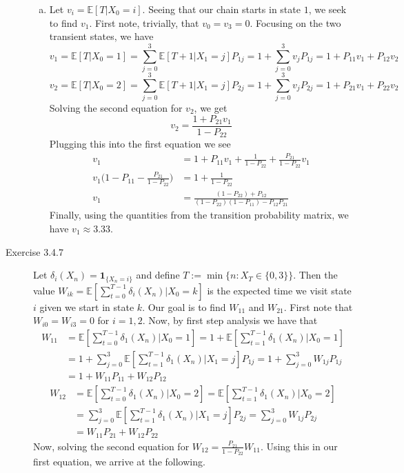 \documentclass[12pt]{article}  %
\newcommand{\E}{{\mathbb{E}}}
\newcommand{\ind}{{\mathbf{1}}}
\begin{document}
\begin{description}
\begin{enumerate}[(a)]
\item Let $v_i = \E[T|X_0=i]$. Seeing that our chain starts in state $1$, we seek to find $v_1$. First note, trivially, that $v_0 = v_3 = 0$. Focusing on the two transient states, we have 
$$v_1 = \E[T|X_0 = 1] = \sum_{j = 0}^{3}\E[T+1|X_1 = j]P_{1j} = 1 + \sum_{j = 0}^3 v_jP_{1j} = 1+P_{11}v_1 + P_{12}v_2$$
$$v_2 = \E[T|X_0 = 2] = \sum_{j = 0}^{3}\E[T+1|X_1 = j]P_{2j} = 1 + \sum_{j = 0}^3 v_jP_{2j} = 1+P_{21}v_1 + P_{22}v_2$$
Solving the second equation for $v_2$, we get 
$$v_2 = \frac{1 + P_{21}v_1}{1-P_{22}}$$ Plugging this into the first equation we see 
\begin{align*}
v_1 &= 1 + P_{11}v_1 + \frac{1}{1-P_{22}} + \frac{P_{21}}{1-P_{22}}v_1\\
v_1\Big(1 - P_{11} - \frac{P_{21}}{1-P_{22}}\Big) &= 1 + \frac{1}{1-P_{22}}\\
v_1 &= \frac{(1-P_{22}) + P_{12}}{(1-P_{22})(1-P_{11})-P_{12}P_{21}}
\end{align*}
Finally, using the quantities from the transition probability matrix, we have $v_1 \approx 3.33$. 
\end{enumerate}
\item[Exercise 3.4.7] Let $\delta_{i}(X_n) = \ind_{\{X_{n} = i\}}$ and define $T := \min\{n: X_T\in\{0,3\}\}$. Then the value $W_{ik} = \E\left[\sum_{t = 0}^{T-1}\delta_{i}(X_n)|X_0 = k\right]$ is the expected time we visit state $i$ given we start in state $k$. Our goal is to find $W_{11}$ and $W_{21}$. First note that $W_{i0} = W_{i3} = 0$ for $i = 1,2$. Now, by first step analysis we have that 
\begin{align*}
W_{11} &= \E\left[\sum_{t = 0}^{T-1}\delta_{1}(X_n)|X_0 = 1\right] = 1 + \E\left[\sum_{t = 1}^{T-1}\delta_{1}(X_n)|X_0 = 1\right]\\
&= 1 + \sum_{j = 0}^3\E\left[\sum_{t = 1}^{T-1}\delta_{1}(X_n)|X_1 = j\right]P_{1j} = 1 + \sum_{j = 0}^3W_{1j}P_{1j}\\
&= 1 + W_{11}P_{11} + W_{12}P_{12}
\end{align*}
\begin{align*}
W_{12} &= \E\left[\sum_{t = 0}^{T-1}\delta_{1}(X_n)|X_0 = 2\right] = \E\left[\sum_{t = 1}^{T-1}\delta_{1}(X_n)|X_0 = 2\right]\\
&= \sum_{j = 0}^3\E\left[\sum_{t = 1}^{T-1}\delta_{1}(X_n)|X_1 = j\right]P_{2j} = \sum_{j = 0}^3W_{1j}P_{2j}\\
&= W_{11}P_{21} + W_{12}P_{22}
\end{align*}
Now, solving the second equation for $W_{12} = \frac{P_{21}}{1-P_{22}}W_{11}$. Using this in our first equation, we arrive at the following. 

\end{description}
\end{document}
